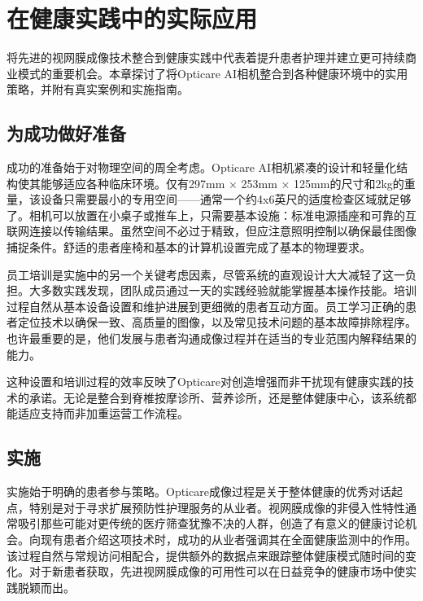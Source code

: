\documentclass[
  Letterpaper,
]{scrbook}
\begin{document}

\chapter{在健康实践中的实际应用}\label{ux5728ux5065ux5eb7ux5b9eux8df5ux4e2dux7684ux5b9eux9645ux5e94ux7528}

将先进的视网膜成像技术整合到健康实践中代表着提升患者护理并建立更可持续商业模式的重要机会。本章探讨了将Opticare
AI相机整合到各种健康环境中的实用策略，并附有真实案例和实施指南。

\section{为成功做好准备}\label{ux4e3aux6210ux529fux505aux597dux51c6ux5907}

成功的准备始于对物理空间的周全考虑。Opticare
AI相机紧凑的设计和轻量化结构使其能够适应各种临床环境。仅有297mm × 253mm
×
125mm的尺寸和2kg的重量，该设备只需要最小的专用空间------通常一个约4x6英尺的适度检查区域就足够了。相机可以放置在小桌子或推车上，只需要基本设施：标准电源插座和可靠的互联网连接以传输结果。虽然空间不必过于精致，但应注意照明控制以确保最佳图像捕捉条件。舒适的患者座椅和基本的计算机设置完成了基本的物理要求。

员工培训是实施中的另一个关键考虑因素，尽管系统的直观设计大大减轻了这一负担。大多数实践发现，团队成员通过一天的实践经验就能掌握基本操作技能。培训过程自然从基本设备设置和维护进展到更细微的患者互动方面。员工学习正确的患者定位技术以确保一致、高质量的图像，以及常见技术问题的基本故障排除程序。也许最重要的是，他们发展与患者沟通成像过程并在适当的专业范围内解释结果的能力。

这种设置和培训过程的效率反映了Opticare对创造增强而非干扰现有健康实践的技术的承诺。无论是整合到脊椎按摩诊所、营养诊所，还是整体健康中心，该系统都能适应支持而非加重运营工作流程。

\section{实施}\label{ux5b9eux65bd}

实施始于明确的患者参与策略。Opticare成像过程是关于整体健康的优秀对话起点，特别是对于寻求扩展预防性护理服务的从业者。视网膜成像的非侵入性特性通常吸引那些可能对更传统的医疗筛查犹豫不决的人群，创造了有意义的健康讨论机会。向现有患者介绍这项技术时，成功的从业者强调其在全面健康监测中的作用。该过程自然与常规访问相配合，提供额外的数据点来跟踪整体健康模式随时间的变化。对于新患者获取，先进视网膜成像的可用性可以在日益竞争的健康市场中使实践脱颖而出。
\end{document}
